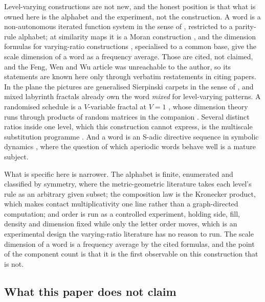 \documentclass[11pt]{amsart}
\theoremstyle{definition}
\theoremstyle{remark}
\begin{document}
Level-varying constructions are not new, and the honest position is that what is owned here is the alphabet and the experiment, not the construction. A word is a non-autonomous iterated function system in the sense of \cite{rempeurbanski}, restricted to a parity-rule alphabet; at similarity maps it is a Moran construction \cite{moran}, and the dimension formulas for varying-ratio constructions \cite{fengwenwu}, specialised to a common base, give the scale dimension of a word as a frequency average. Those are cited, not claimed, and the Feng, Wen and Wu article was unreachable to the author, so its statements are known here only through verbatim restatements in citing papers. In the plane the pictures are generalised Sierpinski carpets in the sense of \cite{cristea2010}, and mixed labyrinth fractals \cite{cristea2017} already own the word \emph{mixed} for level-varying patterns. A randomised schedule is a $V$-variable fractal at $V = 1$ \cite{bhs2008}, whose dimension theory runs through products of random matrices in the companion \cite{bhs2012}. Several distinct ratios inside one level, which this construction cannot express, is the multiscale substitution programme \cite{smilansky}. And a word is an S-adic directive sequence in symbolic dynamics \cite{berthedelecroix}, where the question of which aperiodic words behave well is a mature subject.

What is specific here is narrower. The alphabet is finite, enumerated and classified by symmetry, where the metric-geometric literature takes each level's rule as an arbitrary given subset; the composition law is the Kronecker product, which makes contact multiplicativity one line rather than a graph-directed computation; and order is run as a controlled experiment, holding side, fill, density and dimension fixed while only the letter order moves, which is an experimental design the varying-ratio literature has no reason to run. The scale dimension of a word is a frequency average by the cited formulas, and the point of the component count is that it is the first observable on this construction that is not.

\subsection*{What this paper does not claim}
\end{document}
